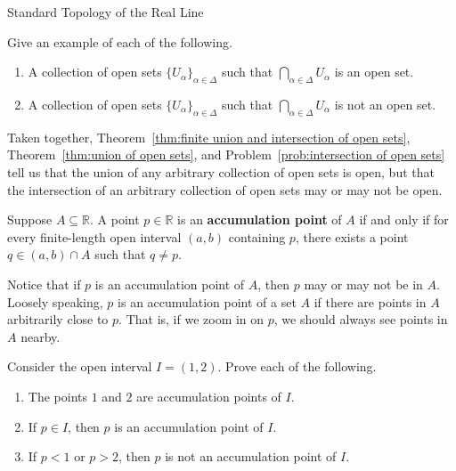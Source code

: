 \begin{section}{Standard Topology of the Real Line}
\begin{problem}\label{prob:intersection of open sets}
Give an example of each of the following.
\begin{enumerate}[label=\textrm{(\alph*)}]
\item A collection of open sets $\{U_{\alpha}\}_{\alpha\in\Delta}$ such that $\bigcap_{\alpha\in\Delta} U_{\alpha}$ is an open set.
\item A collection of open sets $\{U_{\alpha}\}_{\alpha\in\Delta}$ such that $\bigcap_{\alpha\in\Delta} U_{\alpha}$ is not an open set.
\end{enumerate}
\end{problem}

\begin{remark}\label{rem:union vs intersection of open sets}
Taken together, Theorem~\ref{thm:finite union and intersection of open sets}, Theorem~\ref{thm:union of open sets}, and Problem~\ref{prob:intersection of open sets} tell us that the union of any arbitrary collection of open sets is open, but that the intersection of an arbitrary collection of open sets may or may not be open.  
\end{remark}

\begin{definition}
Suppose $A\subseteq \mathbb{R}$. A point $p\in \mathbb{R}$ is an \textbf{accumulation point} of $A$ if and only if for every finite-length open interval $(a,b)$ containing $p$, there exists a point $q \in (a,b)\cap A$ such that $q\neq p$.
\end{definition}

Notice that if $p$ is an accumulation point of $A$, then $p$ may or may not be in $A$. Loosely speaking, $p$ is an accumulation point of a set $A$ if there are points in $A$ arbitrarily close to $p$. That is, if we zoom in on $p$, we should always see points in $A$ nearby.

\begin{problem}
Consider the open interval $I=(1,2)$. Prove each of the following.
\begin{enumerate}[label=\textrm{(\alph*)}]
\item The points $1$ and $2$ are accumulation points of $I$.
\item If $p\in I$, then $p$ is an accumulation point of $I$.
\item If $p<1$ or $p>2$, then $p$ is not an accumulation point of $I$.
\end{enumerate}
\end{problem}


\end{section}

